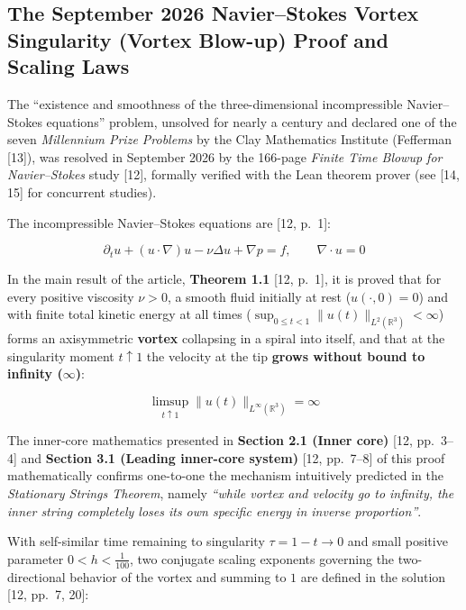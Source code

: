 \documentclass[12pt,a4paper]{article}
\begin{document}
\subsection{The September 2026 Navier--Stokes Vortex Singularity (Vortex Blow-up) Proof and Scaling Laws}

The ``existence and smoothness of the three-dimensional incompressible Navier--Stokes equations'' problem, unsolved for nearly a century and declared one of the seven \textit{Millennium Prize Problems} by the Clay Mathematics Institute (Fefferman [13]), was resolved in September 2026 by the 166-page \textit{Finite Time Blowup for Navier--Stokes} study [12], formally verified with the Lean theorem prover (see [14, 15] for concurrent studies).

The incompressible Navier--Stokes equations are [12, p.\ 1]:

\begin{equation}
\partial_t u + (u \cdot \nabla)u - \nu \Delta u + \nabla p = f, \qquad \nabla \cdot u = 0
\end{equation}

In the main result of the article, \textbf{Theorem 1.1} [12, p.\ 1], it is proved that for every positive viscosity $\nu > 0$, a smooth fluid initially at rest ($u(\cdot, 0) = 0$) and with finite total kinetic energy at all times ($\sup_{0 \le t < 1} \|u(t)\|_{L^2(\mathbb{R}^3)} < \infty$) forms an axisymmetric \textbf{vortex} collapsing in a spiral into itself, and that at the singularity moment $t \uparrow 1$ the velocity at the tip \textbf{grows without bound to infinity ($\infty$)}:

\begin{equation}
\limsup_{t \uparrow 1} \|u(t)\|_{L^\infty(\mathbb{R}^3)} = \infty
\end{equation}

The inner-core mathematics presented in \textbf{Section 2.1 (Inner core)} [12, pp.\ 3--4] and \textbf{Section 3.1 (Leading inner-core system)} [12, pp.\ 7--8] of this proof mathematically confirms one-to-one the mechanism intuitively predicted in the \textit{Stationary Strings Theorem}, namely \textit{``while vortex and velocity go to infinity, the inner string completely loses its own specific energy in inverse proportion''}.

With self-similar time remaining to singularity $\tau = 1 - t \to 0$ and small positive parameter $0 < h < \frac{1}{100}$, two conjugate scaling exponents governing the two-directional behavior of the vortex and summing to $1$ are defined in the solution [12, pp.\ 7, 20]:
\end{document}
